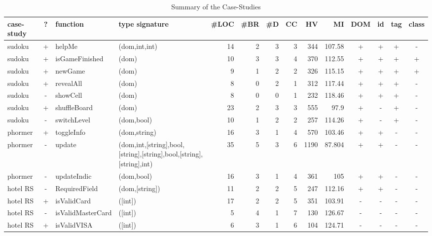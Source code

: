 \documentclass[sigconf]{acmart}
\begin{document}
\begin{table*}[t]
  \caption{Summary of the Case-Studies}
  \label{tbl.case.studies}
    \scriptsize
  \begin{tabular}{l|c|l|l|r|r|r|r|r|r|c|c|c|c}
    \toprule
    \textbf{case-study} & \textbf{?} & \textbf{function} & \textbf{type signature} & \textbf{\#LOC} & \textbf{\#BR} & \textbf{\#D} & \textbf{CC} & \textbf{HV} & \textbf{MI} & \textbf{DOM} & \textbf{id} & \textbf{tag} & \textbf{class} \\
    \hline
    sudoku     & + & helpMe & (dom,int,int)    & 14 & 2 & 3 & 3 & 344 & 107.58 & + & + & + & - \\
    sudoku     & + & isGameFinished & (dom)    & 10 & 3 & 3 & 4 & 370 & 112.55 & + & + & + & + \\
    sudoku     & + & newGame & (dom)           & 9  & 1 & 2 & 2 & 326 & 115.15 & + & + & + & + \\
    sudoku     & + & revealAll & (dom)         & 8  & 0 & 2 & 1 & 312 & 117.44 & + & + & + & - \\
    sudoku     & - & showCell & (dom)         & 8  & 0 & 0 & 1 & 232 & 118.46 & + & + & + & - \\
    sudoku     & + & shuffleBoard & (dom)      & 23 & 2 & 3 & 3 & 555 & 97.9   & + & - & + & - \\
    sudoku     & - & switchLevel & (dom,bool) & 10 & 1 & 2 & 2 & 257 & 114.26 & + & - & + & - \\
    \hline
    phormer    & + & toggleInfo & (dom,string)                                                      & 16 & 3 & 1 & 4 & 570  & 103.46 & + & + & - & - \\
    phormer    & - & update & (dom,int,[string],bool,[string],[string],bool,[string],[string],int) & 35 & 5 & 3 & 6 & 1190 & 87.804 & + & + & - & - \\
    phormer    & - & updateIndic & (dom,bool)                                                      & 16 & 3 & 1 & 4 & 361  & 105    & + & + & - & - \\
    \hline
    hotel RS   & - & RequiredField & (dom,[string]) & 11 & 2 & 2 & 5 & 247  & 112.16 & + & + & - & - \\
    hotel RS   & + & isValidCard & ([int])           & 17 & 2 & 2 & 5 & 351  & 103.91 & - & - & - & - \\
    hotel RS   & - & isValidMasterCard & ([int])     & 5  & 4 & 1 & 7 & 130  & 126.67 & - & - & - & - \\
    hotel RS   & + & isValidVISA & ([int])           & 6  & 3 & 1 & 6 & 104  & 124.71 & - & - & - & - \\

\end{tabular}
\end{table*}
\end{document}

